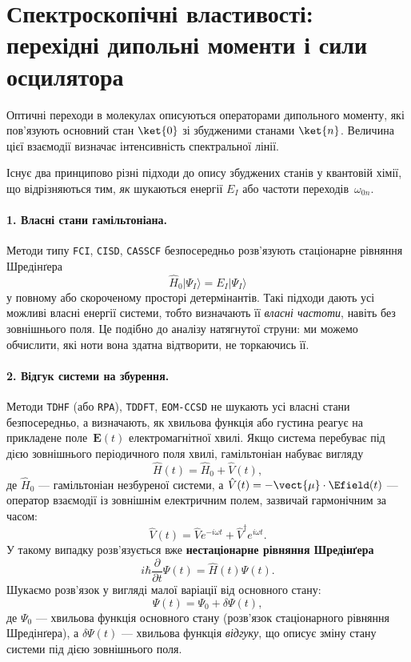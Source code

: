 \section{Спектроскопічні властивості: перехідні дипольні моменти і сили осцилятора}

Оптичні переходи в молекулах описуються операторами дипольного моменту,
які пов'язують основний стан $\ket{0}$ зі збудженими станами $\ket{n}$.
Величина цієї взаємодії визначає інтенсивність спектральної лінії.

Існує два принципово різні підходи до опису збуджених станів у квантовій хімії,
що відрізняються тим, \emph{як} шукаються енергії $E_I$ або частоти переходів~$\omega_{0n}$.

\paragraph{1. Власні стани гамільтоніана.}
Методи типу \texttt{FCI}, \texttt{CISD}, \texttt{CASSCF}
безпосередньо розв’язують стаціонарне рівняння Шредінґера
\[
    \hat{H}_0|\Psi_I\rangle = E_I|\Psi_I\rangle
\]
у повному або скороченому просторі детермінантів.
Такі підходи дають усі можливі власні енергії системи,
тобто визначають її \emph{власні частоти}, навіть без зовнішнього поля.
Це подібно до аналізу натягнутої струни: ми можемо обчислити,
які ноти вона здатна відтворити, не торкаючись її.

\paragraph{2. Відгук системи на збурення.}
Методи \texttt{TDHF} (або \texttt{RPA}), \texttt{TDDFT}, \texttt{EOM-CCSD}
не шукають усі власні стани безпосередньо, а визначають,
як хвильова функція або густина реагує на прикладене поле~$\mathbf{E}(t)$ електромагнітної хвилі. Якщо система перебуває під дією зовнішнього періодичного поля хвилі,
гамільтоніан набуває вигляду
\[
    \hat{H}(t) = \hat{H}_0 + \hat{V}(t),
\]
де $\hat{H}_0$ --- гамільтоніан незбуреної системи,
а $\hat{V}(t) = -\vect{\mu}\cdot\Efield(t)$ --- оператор взаємодії із зовнішнім електричним полем,
зазвичай гармонічним за часом:
\[
    \hat{V}(t) = \hat{V}e^{-i\omega t} + \hat{V}^\dagger e^{i\omega t}.
\]
У такому випадку розв'язується вже \textbf{нестаціонарне рівняння Шредінґера}
\[
    i\hbar\frac{\partial}{\partial t}\Psi(t) = \hat{H}(t)\Psi(t).
\]
Шукаємо розв'язок у вигляді малої варіації від основного стану:
\[
    \Psi(t) = \Psi_0 + \delta\Psi(t),
\]
де $\Psi_0$ --- хвильова функція основного стану (розв’язок стаціонарного рівняння Шредінґера),
а $\delta\Psi(t)$ --- хвильова функція \emph{відгуку}, що описує зміну
стану системи під дією зовнішнього поля.

